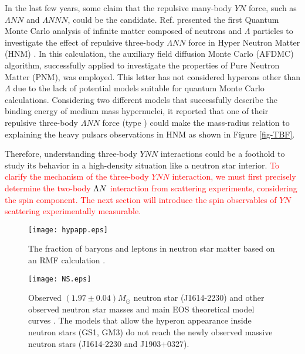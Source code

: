 In the last few years, some claim that the repulsive many-body $YN$ force, such as $\Lambda NN$ and $\Lambda NNN$, could be the candidate. Ref. \cite{Schmidt-1999} presented the first Quantum Monte Carlo analysis of infinite matter composed of neutrons and $\Lambda$ particles to investigate the effect of repulsive three-body $\Lambda NN$ force in Hyper Neutron Matter (HNM) \cite{Diego-2015}. In this calculation, the auxiliary field diffusion Monte Carlo (AFDMC) algorithm, successfully applied to investigate the properties of Pure Neutron Matter (PNM), was employed. This letter has not considered hyperons other than $\Lambda$ due to the lack of potential models suitable for quantum Monte Carlo calculations. Considering two different models that successfully describe the binding energy of medium mass hypernuclei, it reported that one of their repulsive three-body $\Lambda NN$ force (type ) could make the mass-radius relation to explaining the heavy pulsars observations in HNM as shown in Figure \ref{fig-TBF}.

Therefore, understanding three-body $YNN$ interactions could be a foothold to study its behavior in a high-density situation like a neutron star interior. \textcolor{red}{To clarify the mechanism of the three-body $YNN$ interaction, we must first precisely determine the two-body $\Lambda N$ interaction from scattering experiments, considering the spin component. The next section will introduce the spin observables of $YN$ scattering experimentally measurable.}

\begin{figure}[h]
  \begin{center}
   \texttt{[image: hypapp.eps]}
   \caption{The fraction of baryons and leptons in neutron star matter based on an RMF calculation \cite{RMF-2008}.}
   \label{fig-hypapp}
 \end{center}
\end{figure}

\begin{figure}[h]
  \begin{center}
   \texttt{[image: NS.eps]}
   \caption{Observed $(1.97\pm0.04)M_{\odot}$ neutron star (J1614-2230) and other observed neutron star masses and main EOS theoretical model curves \cite{NS-1}. The models that allow the hyperon appearance inside neutron stars (GS1, GM3) do not reach the newly observed massive neutron stars (J1614-2230 and J1903+0327).}
   \label{fig-NS}
 \end{center}
\end{figure}

